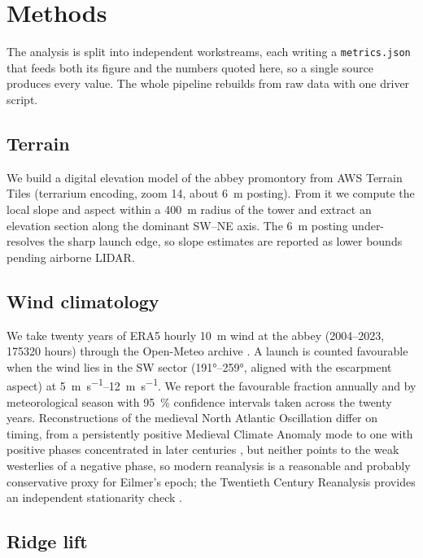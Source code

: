 \section{Methods}
\label{sec:methods}

The analysis is split into independent workstreams, each writing a
\texttt{metrics.json} that feeds both its figure and the numbers quoted here, so a
single source produces every value.
The whole pipeline rebuilds from raw data with one driver script.

\subsection{Terrain}

We build a digital elevation model of the abbey promontory from AWS Terrain Tiles
(terrarium encoding, zoom 14, about \SI{6}{\meter} posting).
From it we compute the local slope and aspect within a \SI{400}{\meter} radius of
the tower and extract an elevation section along the dominant SW--NE axis.
The \SI{6}{\meter} posting under-resolves the sharp launch edge, so slope estimates
are reported as lower bounds pending airborne LIDAR.

\subsection{Wind climatology}

We take twenty years of ERA5 hourly \SI{10}{\meter} wind at the abbey (2004--2023,
\num{175320} hours) through the Open-Meteo archive
\autocite{hersbach2020era5,openmeteo_archive}.
A launch is counted favourable when the wind lies in the SW sector
(\ang{191}--\ang{259}, aligned with the escarpment aspect) at \SIrange{5}{12}{\meter\per\second}.
We report the favourable fraction annually and by meteorological season with
\SI{95}{\percent} confidence intervals taken across the twenty years.
Reconstructions of the medieval North Atlantic Oscillation differ on timing,
from a persistently positive Medieval Climate Anomaly mode
\autocite{trouet2009nao} to one with positive phases concentrated in later centuries
\autocite{ortega2015nao}, but neither points to the weak westerlies of a negative
phase, so modern reanalysis is a reasonable and probably conservative proxy
for Eilmer's epoch; the Twentieth Century Reanalysis provides an independent
stationarity check \autocite{slivinski2019twentieth}.

\subsection{Ridge lift}

